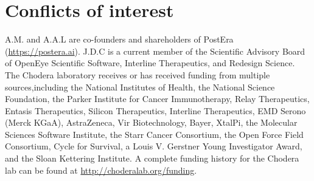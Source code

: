 \documentclass[twoside,twocolumn,9pt]{article}
\renewcommand{\refname}{Notes and references}
\begin{document}
\section*{Conflicts of interest}
A.M. and A.A.L are co-founders and shareholders of PostEra (\url{https://postera.ai}). J.D.C is a current member of the Scientific Advisory Board of OpenEye Scientific Software, Interline Therapeutics, and Redesign Science. The Chodera laboratory receives or has received funding from multiple sources,including the National Institutes of Health, the National Science Foundation, the Parker Institute for Cancer Immunotherapy, Relay Therapeutics, Entasis Therapeutics, Silicon Therapeutics, Interline Therapeutics, EMD Serono (Merck KGaA), AstraZeneca, Vir Biotechnology, Bayer, XtalPi, the Molecular Sciences Software Institute, the Starr Cancer Consortium, the Open Force Field Consortium, Cycle for Survival, a Louis V. Gerstner Young Investigator Award, and the Sloan Kettering Institute. A complete funding history for the Chodera lab can be found at \url{http://choderalab.org/funding}.





\scriptsize{
 } %
\end{document}
